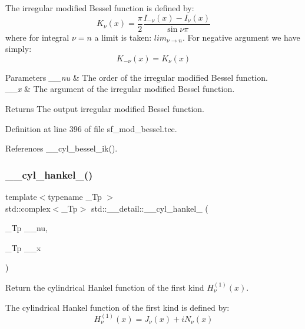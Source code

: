 The irregular modified Bessel function is defined by\+: \[ K_{\nu}(x) = \frac{\pi}{2} \frac{I_{-\nu}(x) - I_{\nu}(x)}{\sin \nu\pi} \] where for integral $ \nu = n $ a limit is taken\+: $ lim_{\nu \to n} $. For negative argument we have simply\+: \[ K_{-\nu}(x) = K_{\nu}(x) \]


\begin{DoxyParams}{Parameters}
{\em \+\_\+\+\_\+nu} & The order of the irregular modified Bessel function. \\
\hline
{\em \+\_\+\+\_\+x} & The argument of the irregular modified Bessel function. \\
\hline
\end{DoxyParams}
\begin{DoxyReturn}{Returns}
The output irregular modified Bessel function. 
\end{DoxyReturn}


Definition at line 396 of file sf\+\_\+mod\+\_\+bessel.\+tcc.



References \+\_\+\+\_\+cyl\+\_\+bessel\+\_\+ik().

\mbox{\label{namespacestd_1_1____detail_aac3fc60c1210e8f2ae3cf05cdc7bad84}} 
\subsubsection{\texorpdfstring{\+\_\+\+\_\+cyl\+\_\+hankel\+\_()}{\_\_cyl\_hankel\_1()}\hspace{0.1cm}{\footnotesize\ttfamily [1/2]}}
{\footnotesize\ttfamily template$<$typename \+\_\+\+Tp $>$ \\
std\+::complex$<$\+\_\+\+Tp$>$ std\+::\+\_\+\+\_\+detail\+::\+\_\+\+\_\+cyl\+\_\+hankel\+\_ (\begin{DoxyParamCaption}\item[{\+\_\+\+Tp}]{\+\_\+\+\_\+nu,  }\item[{\+\_\+\+Tp}]{\+\_\+\+\_\+x }\end{DoxyParamCaption})}



Return the cylindrical Hankel function of the first kind $ H^{(1)}_\nu(x) $. 

The cylindrical Hankel function of the first kind is defined by\+: \[ H^{(1)}_\nu(x) = J_\nu(x) + i N_\nu(x) \]


